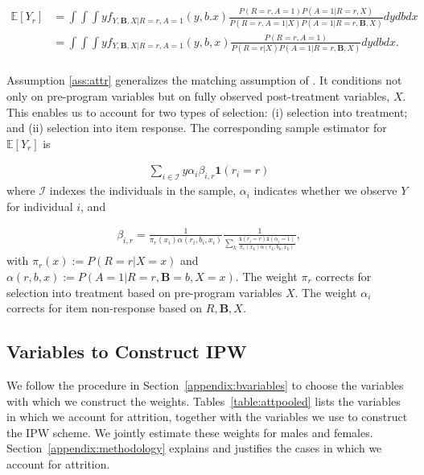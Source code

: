 \begin{align*} \label{eq:case2ipw}
\mathbb{E}[Y_r] & = \int \int \int y f_{Y,\bm{B},X|R=r,A=1}(y,b.x) \frac{P(R=r,A=1) P(A=1|R=r,X)}{P(R=r,A=1|X) P(A=1|R=r,\bm{B},X)} dydbdx \\
	            & = \int \int  \int y f_{Y,\bm{B},X|R=r,A=1}(y,b,x) \frac{P(R=r,A=1)}{P(R=r|X) P(A=1|R=r,\bm{B},X)} dydbdx. \\
\end{align*}

\noindent Assumption \ref{ass:attr} generalizes the matching assumption of \citet{Campbell_Conti_etal_2014_EarlyChildhoodInvestments}. It conditions not only on pre-program variables but on fully observed post-treatment variables, $X$. This enables us to account for two types of selection:  (i) selection into treatment; and (ii) selection into item response. The corresponding sample estimator for $\mathbb{E}[Y_r]$ is

\begin{align*}
\sum_{i \in \mathcal{I}} y \alpha_{i} \beta_{i,r} \mathbf{1}(r_i = r)
\end{align*}
\noindent where $\mathcal{I}$ indexes the individuals in the sample, $\alpha_i$ indicates whether we observe $Y$ for individual $i$, and

\begin{align*}
	\beta_{i,r} = \frac{1}{\pi_r(x_i) \alpha(r_i,b_i,x_i)} \frac{1}{\sum_k{\frac{\mathbf{1}(r_i = r) \mathbf{1}(\alpha_i = 1)}{\pi_r(x_k)\alpha(r_k,b_k,x_k)}}},
\end{align*}
\noindent with $\pi_r(x) := P(R=r|X=x)$ and $\alpha(r,b,x) := P(A=1|R=r,\bm{B}=b,X=x)$. The weight $\pi_r$ corrects for selection into treatment based on pre-program variables $X$. The weight $\alpha_{i}$ corrects for item non-response based on $R, \bm{B}, X$.\\

\subsection{Variables to Construct IPW}

\noindent We follow the procedure in Section~\ref{appendix:bvariables} to choose the variables with which we construct the weights. Tables~\ref{table:attpooled} lists the variables in which we account for attrition, together with the variables we use to construct the IPW scheme. We jointly estimate these weights for males and females. Section~\ref{appendix:methodology} explains and justifies the cases in which we account for attrition.


